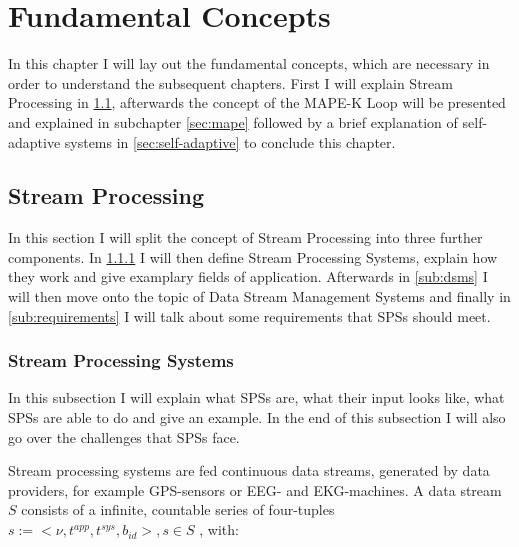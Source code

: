 \chapter{Fundamental Concepts}
\label{cha:fundamentals}
In this chapter I will lay out the fundamental concepts, which are necessary in order to understand the subsequent chapters.
First I will explain Stream Processing in \ref{sec:stream-processing}, afterwards the concept of the MAPE-K Loop will be presented and explained in subchapter \ref{sec:mape} 
followed by a brief explanation of self-adaptive systems in \ref{sec:self-adaptive} to conclude this chapter.

    \section{Stream Processing}
    \label{sec:stream-processing}
    In this section I will split the concept of Stream Processing into three further components.
    In \ref{sub:sps} I will then define Stream Processing Systems, explain how they work and give examplary fields of application.
    Afterwards in \ref{sub:dsms} I will then move onto the topic of Data Stream Management Systems and finally in \ref{sub:requirements} I will talk about
    some requirements that SPSs should meet.
    
        \subsection{Stream Processing Systems}
        \label{sub:sps}
        In this subsection I will explain what SPSs are, what their input looks like, what SPSs are able to do and give an example.
        In the end of this subsection I will also go over the challenges that SPSs face.

        Stream processing systems are fed continuous data streams, generated by data providers, for example GPS-sensors or EEG- and EKG-machines.
        A data stream $S$ consists of a infinite, countable series of four-tuples $s := <\nu, t^{app }, t^{sys}, b_{id}>, s \in S$  \cite{Panigati2015}, with:

